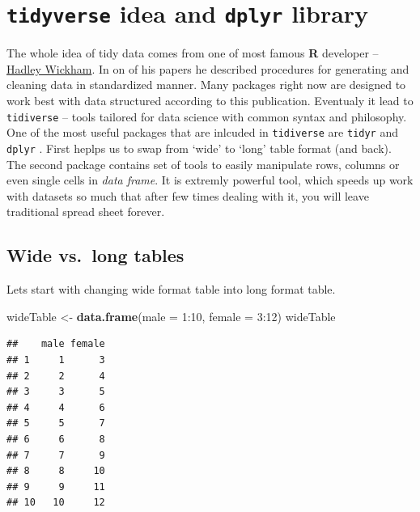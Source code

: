 \documentclass[]{book}
\newenvironment{Shaded}{\begin{snugshade}}{\end{snugshade}}
\newcommand{\KeywordTok}[1]{\textcolor[rgb]{0.12,0.11,0.11}{\textbf{#1}}}
\newcommand{\DataTypeTok}[1]{\textcolor[rgb]{0.00,0.34,0.68}{#1}}
\newcommand{\DecValTok}[1]{\textcolor[rgb]{0.69,0.50,0.00}{#1}}
\newcommand{\StringTok}[1]{\textcolor[rgb]{0.75,0.01,0.01}{#1}}
\newcommand{\OperatorTok}[1]{\textcolor[rgb]{0.12,0.11,0.11}{#1}}
\newcommand{\NormalTok}[1]{\textcolor[rgb]{0.12,0.11,0.11}{#1}}
\theoremstyle{definition}
\theoremstyle{definition}
\theoremstyle{definition}
\theoremstyle{remark}
\begin{document}
\section{\texorpdfstring{\texttt{tidyverse} idea and \texttt{dplyr}
library}{tidyverse idea and dplyr library}}\label{tidyverse-idea-and-dplyr-library}

The whole idea of tidy data comes from one of most famous \textbf{R}
developer -- \href{http://hadley.nz/}{Hadley Wickham}. In on of his
papers \citep{hadley2014} he described procedures for generating and
cleaning data in standardized manner. Many packages right now are
designed to work best with data structured according to this
publication. Eventualy it lead to \texttt{tidiverse} -- tools tailored
for data science with common syntax and philosophy\citep{tidyverse2017}.
One of the most useful packages that are inlcuded in \texttt{tidiverse}
\citep{tidyverse2017} are \texttt{tidyr} \citep{tidyr2017} and
\texttt{dplyr} \citep{dplyr2017}. First heplps us to swap from `wide' to
`long' table format (and back). The second package contains set of tools
to easily manipulate rows, columns or even single cells in \emph{data
frame}. It is extremly powerful tool, which speeds up work with datasets
so much that after few times dealing with it, you will leave traditional
spread sheet forever.

\subsection{Wide vs.~long tables}\label{wide-vs.long-tables}

Lets start with changing wide format table into long format table.

\begin{Shaded}
\begin{Highlighting}[]
\NormalTok{wideTable <-}\StringTok{ }\KeywordTok{data.frame}\NormalTok{(}\DataTypeTok{male =} \DecValTok{1}\OperatorTok{:}\DecValTok{10}\NormalTok{, }\DataTypeTok{female =} \DecValTok{3}\OperatorTok{:}\DecValTok{12}\NormalTok{)}
\NormalTok{wideTable}
\end{Highlighting}
\end{Shaded}

\begin{verbatim}
##    male female
## 1     1      3
## 2     2      4
## 3     3      5
## 4     4      6
## 5     5      7
## 6     6      8
## 7     7      9
## 8     8     10
## 9     9     11
## 10   10     12
\end{verbatim}
\end{document}
